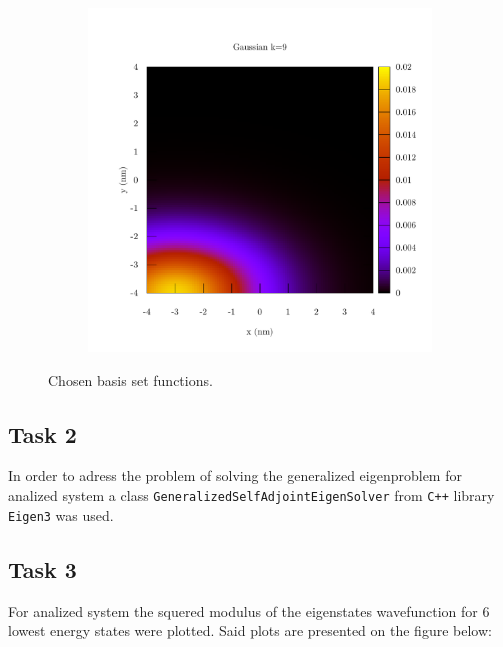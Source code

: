 \documentclass[12pt,a4]{article}
\begin{document}
\begin{figure}[H]
\begin{subfigure}{0.33\textwidth}
	\end{subfigure}
	\begin{subfigure}{0.33\textwidth}
		\includegraphics[width=\textwidth]{../plots/basis_9.pdf}
	\end{subfigure}
	\caption{Chosen basis set functions.}
\end{figure}

\subsection*{Task 2}

In order to adress the problem of solving the generalized eigenproblem for analized system a class \texttt{GeneralizedSelfAdjointEigenSolver} from \texttt{C++} library \texttt{Eigen3} was used.

\subsection*{Task 3}

For analized system the squered modulus of the eigenstates wavefunction for 6 lowest energy states were plotted. Said plots are presented on the figure below:
\end{document}
